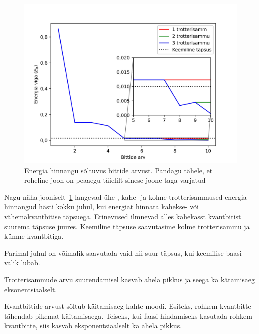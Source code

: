 \documentclass[12pt]{report}
\begin{document}
\begin{figure}[h]
    \centering
    \includegraphics{trotsteps.jpg}
    \caption{Energia hinnangu sõltuvus bittide arvust. Pandagu tähele, et roheline joon on peaaegu täielilt sinese joone taga varjatud}
    \label{fig:trotsteps}
\end{figure}

Nagu näha jooniselt~\ref{fig:trotsteps} langevad ühe-, kahe- ja kolme-trotterisammused energia hinnangud hästi kokku juhul, kui energiat hinnata kahekse- või vähemakvantbitise täpsuega.
Erinevused ilmnevad alles kahekasst kvantbitist suurema täpsuse juures.
Keemiline täpsuse saavutasime kolme trotterisammu ja kümne kvantbitiga.

Parimal juhul on võimalik saavutada vaid nii suur täpsus, kui keemilise baasi valik lubab.

Trotterisammude arvu suurendamisel kasvab ahela pikkus ja seega ka kätamisaeg eksonentsiaalselt.

Kvantbittide arvust sõltub käitamisaeg kahte moodi.
Esiteks, rohkem kvantbitte tähendab pikemat käitamisaega.
Teiseks, kui faasi hindamiseks kasutada rohkem kvantbitte, siis kasvab eksponentsiaalselt ka ahela pikkus.
\end{document}
